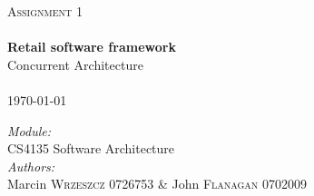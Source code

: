 \begin{titlepage}
 
\begin{center}
 
 
 
 
\textsc{\LARGE Assignment 1}\\[3.5cm]
 
 
\HRule \\[0.6cm]
{ \huge \bfseries Retail software framework}\\Concurrent Architecture\\[0.4cm]
 
\HRule \\[4.0cm]
 {\large \today}\\[9.0cm]

\begin{flushleft} \large
\emph{Module:}\\
CS4135 Software Architecture
\\[0.4cm]
\emph{Authors:}\\
Marcin \textsc{Wrzeszcz} 0726753 \& John \textsc{Flanagan} 0702009
\end{flushleft}

 
\vfill
 

 
\end{center}
 
\end{titlepage}
